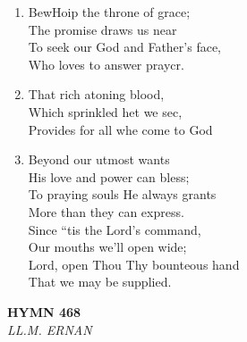 \documentclass[11pt,a4paper]{article}
\begin{document}
\begin{enumerate}
    \item BewHoip the throne of grace; \\
        The promise draws us near \\
        To seek our God and Father's face, \\
        Who loves to answer praycr.

    \item That rich atoning blood, \\
        Which sprinkled het we sec, \\
        Provides for all whe come to God

    \item Beyond our utmost wants \\
        His love and power can bless; \\
        To praying souls He always grants \\
        More than they can express. \\
        Since ``tis the Lord's command, \\
        Our mouths we'll open wide; \\
        Lord, open Thou Thy bounteous hand \\
        That we may be supplied.

\end{enumerate}

\newpage
\begin{center}
    {\Large \textbf{HYMN 468}}
    \\
    \textit{LL.M. ERNAN}
\end{center}
\vspace{1em}
\end{document}
